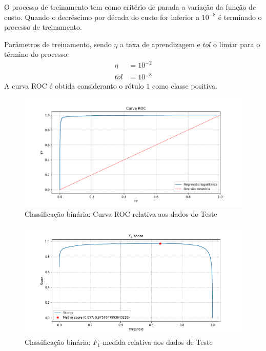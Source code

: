 \documentclass{article}
\begin{document}
        O processo de treinamento tem como critério de parada a variação da função de custo. Quando
        o decréscimo por década do custo for inferior a $10^{-8}$ é terminado o processo de treinamento.

        Parâmetros de treinamento, sendo $\eta$ a taxa de aprendizagem e $tol$ o limiar para o término do processo:
        \begin{align}
            \eta&=10^{-2} \\
            tol&=10^{-8}
        \end{align}
        A curva ROC é obtida consideranto o rótulo $1$ como classe positiva.
        \begin{figure}[H]
            \centering
            \includegraphics[width=\textwidth]{img1/roc.png}
            \caption{Classificação binária: Curva ROC relativa aos dados de Teste}
            \label{fig:a_roc}
        \end{figure}
        \begin{figure}[H]
            \centering
            \includegraphics[width=\textwidth]{img1/f1_score.png}
            \caption{Classificação binária: $F_1$-medida relativa aos dados de Teste}
            \label{fig:a_fi_score}
        \end{figure}
    
\end{document}
